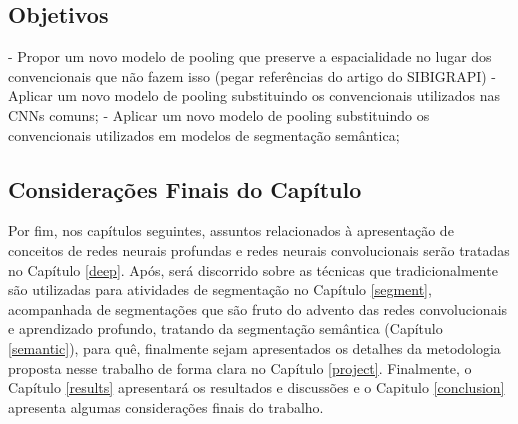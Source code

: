 \subsection{Objetivos}
\label{intro:objectives}
- Propor um novo modelo de pooling que preserve a espacialidade no lugar dos convencionais que não fazem isso (pegar referências do artigo do SIBIGRAPI)
- Aplicar um novo modelo de pooling substituindo os convencionais utilizados nas CNNs comuns;
- Aplicar um novo modelo de pooling substituindo os convencionais utilizados em modelos de segmentação semântica;

\subsection{Considerações Finais do Capítulo}
\label{intro:end}
Por fim, nos capítulos seguintes, assuntos relacionados à apresentação de conceitos de redes neurais profundas e redes neurais convolucionais serão tratadas no Capítulo \ref{deep}. Após, será discorrido sobre as técnicas que tradicionalmente são utilizadas para atividades de segmentação no Capítulo \ref{segment}, acompanhada de segmentações que são fruto do advento das redes convolucionais e aprendizado profundo, tratando da segmentação semântica (Capítulo \ref{semantic}), para quê, finalmente sejam apresentados os detalhes da metodologia proposta nesse trabalho de forma clara no Capítulo \ref{project}.  Finalmente, o Capítulo \ref{results} apresentará os resultados e discussões e o Capitulo \ref{conclusion} apresenta algumas considerações finais do trabalho.